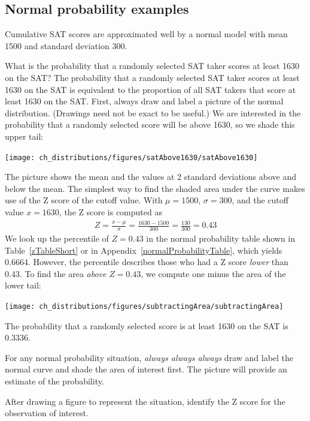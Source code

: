 \subsection{Normal probability examples}

Cumulative SAT scores are approximated well by a normal model with mean 1500 and standard deviation 300.

\begin{example}{What is the probability that a randomly selected SAT taker scores at least 1630 on the SAT?}\label{satAbove1630Exam}
The probability that a randomly selected SAT taker scores at least 1630 on the SAT is equivalent to the proportion of all SAT takers that score at least 1630 on the SAT. First, always draw and label a picture of the normal distribution. (Drawings need not be exact to be useful.) We are interested in the probability that a randomly selected score will be above 1630, so we shade this upper tail:
\begin{center}
\texttt{[image: ch\_distributions/figures/satAbove1630/satAbove1630]}
\end{center}
The picture shows the mean and the values at 2 standard deviations above and below the mean. The simplest way to find the shaded area under the curve makes use of the Z score of the cutoff value. With $\mu=1500$, $\sigma=300$, and the cutoff value $x=1630$, the Z score is computed as
\begin{eqnarray*}
Z = \frac{x - \mu}{\sigma} = \frac{1630 - 1500}{300} = \frac{130}{300} = 0.43
\end{eqnarray*}
We look up the percentile of $Z=0.43$ in the normal probability table shown in Table~\ref{zTableShort} or in Appendix~\vref{normalProbabilityTable}, which yields 0.6664. However, the percentile describes those who had a Z score \emph{lower} than 0.43. To find the area \emph{above} $Z=0.43$, we compute one minus the area of the lower tail:
\begin{center}
\texttt{[image: ch\_distributions/figures/subtractingArea/subtractingArea]}
\end{center}
The probability that a randomly selected score is at least 1630 on the SAT is 0.3336.
\end{example}

\begin{tipBox}{
For any normal probability situation, \emph{always always always} draw and label the normal curve and shade the area of interest first. The picture will provide an estimate of the probability. \vspace{3mm}

After drawing a figure to represent the situation, identify the Z score for the observation of interest.\vspace{1mm}}
\end{tipBox}

